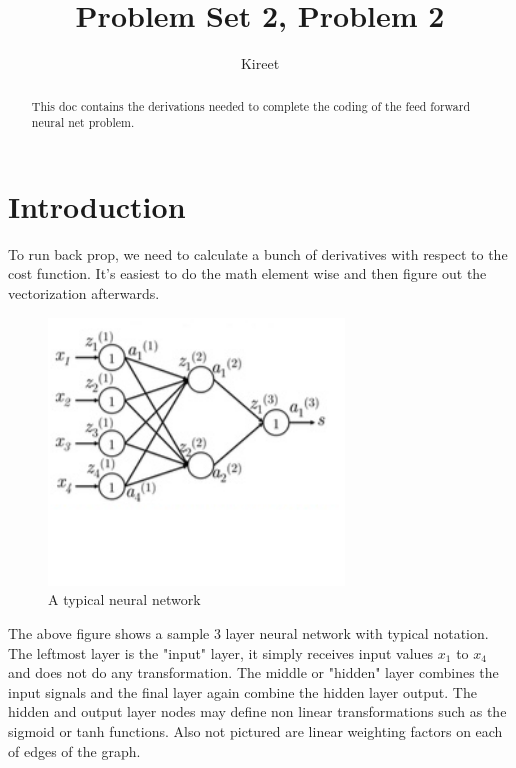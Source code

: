 \documentclass[]{article}
\title{Problem Set 2, Problem 2}
\author{Kireet}
\begin{document}
\maketitle

\begin{abstract}
This doc contains the derivations needed to complete the coding of the feed forward neural net problem.
\end{abstract}

\newpage
\tableofcontents
\newpage

\section{Introduction}
To run back prop, we need to calculate a bunch of derivatives with respect to the cost function. It's easiest to do the math element wise and then figure out the vectorization afterwards.

\begin{figure}[H]
\centering
\includegraphics[width=0.7\textwidth]{neural-net}
\vspace{-7em}
\caption{A typical neural network}
\label{fig:neural-net}
\end{figure}
The above figure shows a sample 3 layer neural network with typical notation. The leftmost layer is the "input" layer, it simply receives input values $x_1$ to $x_4$ and does not do any transformation. The middle or "hidden" layer combines the input signals and the final layer again combine the hidden layer output. The hidden and output layer nodes may define non linear transformations such as the sigmoid or tanh functions. Also not pictured are linear weighting factors on each of edges of the graph. 
\paragraph{}
\end{document}
